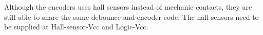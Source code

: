 Although the encoders uses hall sensors instead of mechanic contacts, they are still able to share the same debounce and encoder code.
The hall sensors need to be supplied at Hall-sensor-Vcc and Logic-Vcc.